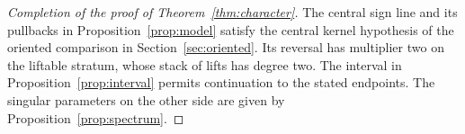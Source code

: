\begin{proof}[Completion of the proof of Theorem~\ref{thm:character}]
The central sign line and its pullbacks in Proposition~\ref{prop:model}
satisfy the central kernel hypothesis of the oriented comparison in
Section~\ref{sec:oriented}. Its reversal has multiplier two on the
liftable stratum, whose stack of lifts has degree two. The interval
in Proposition~\ref{prop:interval} permits continuation to the
stated endpoints. The singular parameters on the other side are
given by Proposition~\ref{prop:spectrum}.
\end{proof}
